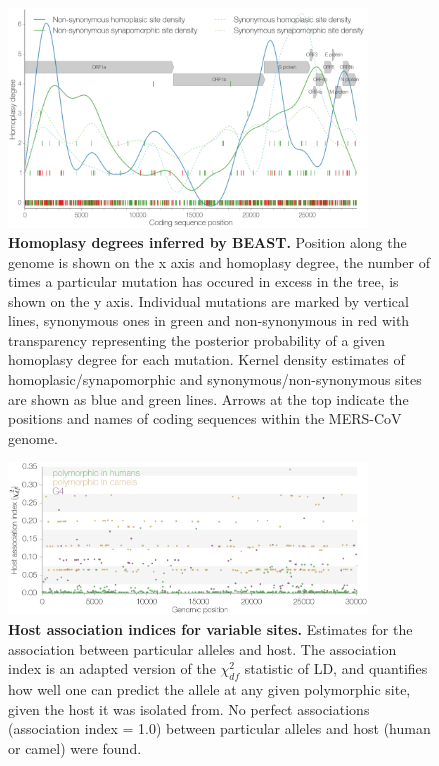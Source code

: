 \documentclass[11pt,oneside,letterpaper]{article}
\begin{document}

\begin{figure}[h]
	\centering	
	\includegraphics[width=0.85\textwidth]{figures/supp_MERS_BEAST_homoplasyRate.png}
	\caption{\textbf{Homoplasy degrees inferred by BEAST.}
Position along the genome is shown on the x axis and homoplasy degree, the number of times a particular mutation has occured in excess in the tree, is shown on the y axis.
Individual mutations are marked by vertical lines, synonymous ones in green and non-synonymous in red with transparency representing the posterior probability of a given homoplasy degree for each mutation.
Kernel density estimates of homoplasic/synapomorphic and synonymous/non-synonymous sites are shown as blue and green lines.
Arrows at the top indicate the positions and names of coding sequences within the MERS-CoV genome.}
	\label{homoplasyRates_Bayesian}
\end{figure}



\begin{figure}[h]
	\centering	
	\includegraphics[width=0.85\textwidth]{figures/supp_MERS_hostAssociation.png}
	\caption{\textbf{Host association indices for variable sites.}
Estimates for the association between particular alleles and host.
The association index is an adapted version of the $\chi^{2}_{df}$ statistic of LD, and quantifies how well one can predict the allele at any given polymorphic site, given the host it was isolated from.
No perfect associations (association index = 1.0) between particular alleles and host (human or camel) were found.}
	\label{host_association}
\end{figure}

\clearpage

%
%
\end{document}
